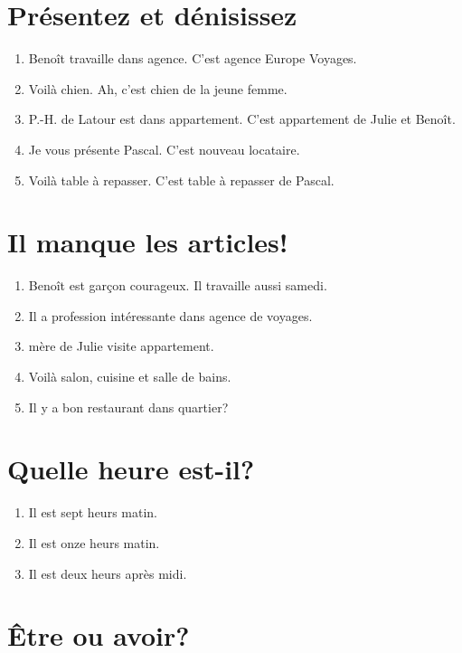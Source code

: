 \section{Présentez et dénisissez}

\begin{enumerate}
    \item Benoît travaille dans  agence. C'est  agence Europe Voyages.
    \item Voilà  chien. Ah, c'est  chien de la jeune femme.
    \item P.-H. de Latour est dans  appartement. C'est appartement de Julie et Benoît.
    \item Je vous présente Pascal. C'est  nouveau locataire.
    \item Voilà  table à repasser. C'est  table à repasser de Pascal.
\end{enumerate}

\section{Il manque les articles!}

\begin{enumerate}
    \item Benoît est  garçon courageux. Il travaille aussi  samedi.
    \item Il a  profession intéressante dans agence de voyages.
    \item {} mère de Julie visite appartement.
    \item Voilà  salon,  cuisine et  salle de bains.
    \item Il y a  bon restaurant dans  quartier?
\end{enumerate}

\section{Quelle heure est-il?}

\begin{enumerate}
    \item Il est sept heurs matin.
    \item Il est onze heurs matin.
    \item Il est deux heurs après midi.
\end{enumerate}

\section{Être ou avoir?}

